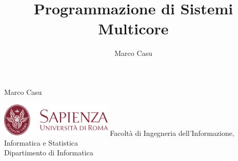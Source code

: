 \documentclass[10pt, letterpaper]{report}
\title{Programmazione di Sistemi Multicore} %
\author{Marco Casu}
\date{\vspace{-5ex}}
\begin{document}
\begin{titlepage}
    \pagecolor{purcop}
\begin{center}
   \Huge Marco Casu\acc
    \HUGE \decothreeleft\hphantom{ }{\Huge\selectfont Programmazione di Sistemi Multicore}\hphantom{ }\decothreeright
\end{center}
\thispagestyle{empty}
\begin{figure}[h]
\end{figure}
\vfill 
\centering \includegraphics[width=0.4\textwidth ]{../../preamble/Stemma_sapienza.png} \acc
\centering \Large \color{sapienza}Facoltà di Ingegneria dell'Informazione,
Informatica e Statistica\\
Dipartimento di Informatica
\end{titlepage}
\end{document}
